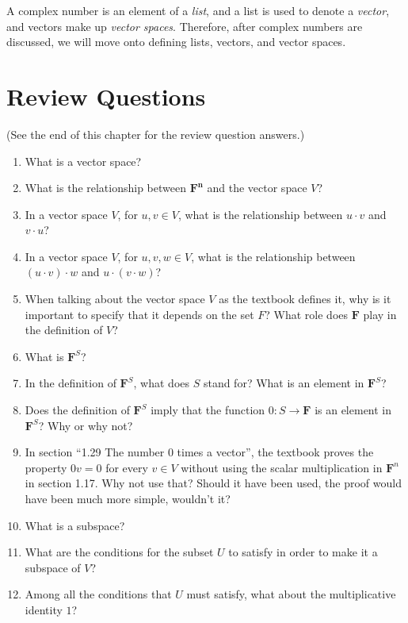 \documentclass[12pt, letterpaper, oneside]{book}
\begin{document}
A complex number is an element of a \emph{list}, and a list is used to denote a
\emph{vector}, and vectors make up \emph{vector spaces}. Therefore, after
complex numbers are discussed, we will move onto defining lists, vectors, and
vector spaces.

\section{Review Questions}

(See the end of this chapter for the review question answers.)

\begin{enumerate}
  \item What is a vector space?
  \item What is the relationship between $\mathbf{F^n}$ and the vector space
    $V$?
  \item In a vector space $V$, for $u, v \in V$, what is the relationship
    between $u \cdot v$ and $v \cdot u$?
  \item In a vector space $V$, for $u, v, w \in V$, what is the relationship
  between $(u \cdot v) \cdot w$ and $u \cdot (v \cdot w)$?
  \item When talking about the vector space $V$ as the textbook defines it, why
    is it important to specify that it depends on the set $F$? What role does
    $\mathbf{F}$ play in the definition of $V$?
  \item What is $\mathbf{F}^S$?
  \item In the definition of $\mathbf{F}^S$, what does $S$ stand for? What is
    an element in $\mathbf{F}^S$?
  \item Does the definition of $\mathbf{F}^S$ imply that the function
    $0: S \rightarrow \mathbf{F}$ is an element in $\mathbf{F}^S$? Why or why
    not?
  \item In section ``1.29 The number 0 times a vector'', the textbook proves
    the property $0v = 0$ for every $v \in V$ without using the scalar
    multiplication in $\mathbf{F}^n$ in section 1.17. Why not use that? Should
    it have been used, the proof would have been much more simple, wouldn't it?
  \item What is a subspace?
  \item What are the conditions for the subset $U$ to satisfy in order to make
    it a subspace of $V$?
  \item Among all the conditions that $U$ must satisfy, what about the
    multiplicative identity $1$?
\end{enumerate}
\end{document}
